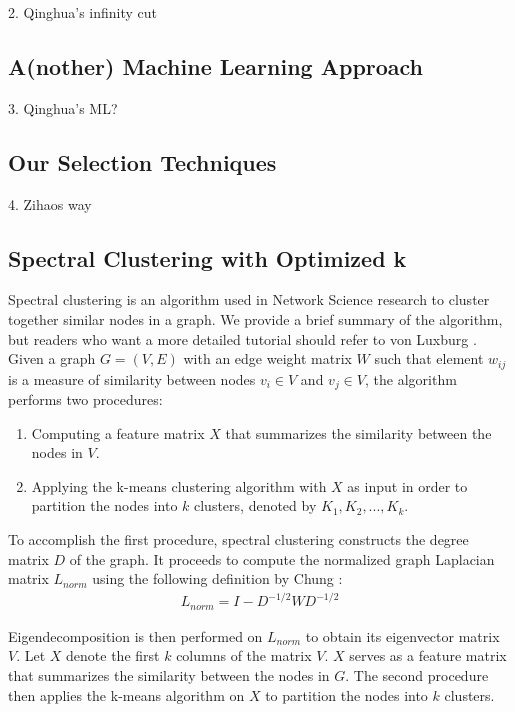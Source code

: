\documentclass[EPiC]{easychair}
\begin{document}
2. Qinghua's infinity cut
\subsection{A(nother) Machine Learning Approach}
\label{QinghuaML}

3. Qinghua's ML?
\subsection{Our Selection Techniques}
\label{Zihao}

4. Zihaos way
\subsection{Spectral Clustering with Optimized k}
\label{Zishi}

Spectral clustering is an algorithm used in Network Science research to
cluster together similar nodes in a graph. We provide a brief summary of the
algorithm, but readers who want a more detailed tutorial should refer to
von Luxburg \cite{vonLuxburg2007}. 
Given a graph $G = (V, E)$ with an edge weight matrix $W$ such that element
$w_{ij}$ is a measure of similarity between nodes $v_{i} \in V$ and 
$v_{j} \in V$, the algorithm performs two procedures:
\begin{enumerate}
\item Computing a feature matrix $X$ that summarizes the similarity 
between the nodes in $V$.

\item Applying the k-means clustering algorithm with $X$ as input in order 
to partition the nodes into $k$ clusters, denoted by
$K_{1}, K_{2}, ..., K_{k}$.
\end{enumerate}

To accomplish the first procedure, spectral clustering constructs the 
degree matrix $D$ of the graph. It proceeds to compute the normalized 
graph Laplacian matrix $L_{norm}$ using the following definition by 
Chung \cite{Chung1997}:
\begin{align}
L_{norm} = I - D^{-1/2} W D^{-1/2}
\end{align}

Eigendecomposition is then performed on $L_{norm}$ to obtain its eigenvector
matrix $V$. Let $X$ denote the first $k$ columns of the matrix $V$. 
$X$ serves as a feature matrix that summarizes the similarity between the 
nodes in $G$. The second procedure then applies the k-means algorithm on $X$
to partition the nodes into $k$ clusters.
\end{document}
